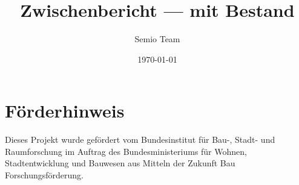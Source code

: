 \documentclass[language=de,theme=dark,type=report,citestyle=numeric]{semio}
\title{Zwischenbericht --- mit Bestand}
\author{Semio Team}
\date{\today}
\begin{document}
\section*{Förderhinweis}
\begin{Blockquote}
Dieses Projekt wurde gefördert vom Bundesinstitut für Bau-, Stadt- und Raumforschung im Auftrag des Bundesministeriums für Wohnen, Stadtentwicklung und Bauwesen aus Mitteln der Zukunft Bau Forschungsförderung.
\end{Blockquote}
\end{document}
